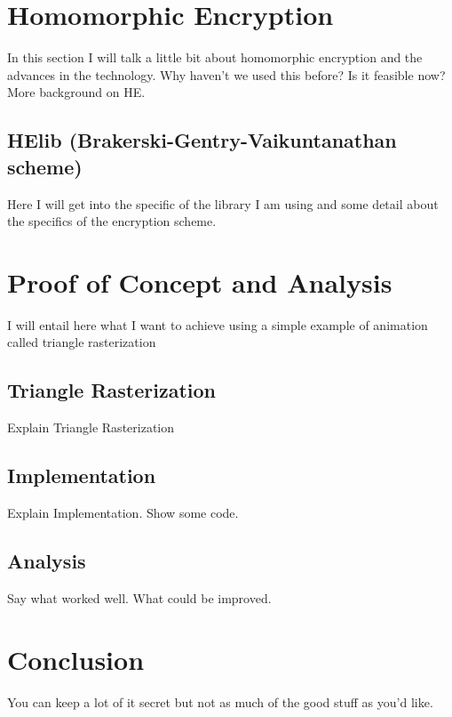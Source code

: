 \documentclass[12pt]{article}
\begin{document}
\section{Homomorphic Encryption}

In this section I will talk a little bit about homomorphic encryption and the advances in the technology. Why haven't we used this before? Is it feasible now? More background on HE.



\subsection{HElib (Brakerski-Gentry-Vaikuntanathan scheme)}

Here I will get into the specific of the library I am using and some detail about the specifics of the encryption scheme.



\section{Proof of Concept and Analysis}

I will entail here what I want to achieve using a simple example of animation called triangle rasterization


\subsection{Triangle Rasterization}

Explain Triangle Rasterization 

\subsection{Implementation}

Explain Implementation. Show some code.

\subsection{Analysis}

Say what worked well. What could be improved.

\section{Conclusion}

You can keep a lot of it secret but not as much of the good stuff as you'd like.
\end{document}
